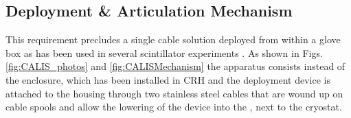 \subsection{Deployment \& Articulation Mechanism}\label{sec:DeploymentArticulation}
This requirement precludes a single cable solution deployed from within a glove box as has been used in several scintillator experiments \cite{Banks:2014hra, Huang:2013uxa}. %
As shown in Figs. \ref{fig:CALIS_photos} and \ref{fig:CALISMechanism} the apparatus consists instead of the enclosure, which has been installed in CRH and the deployment device is attached to the housing through two stainless steel cables that are wound up on cable spools and allow the lowering of the device into the \lsv, next to the cryostat.
